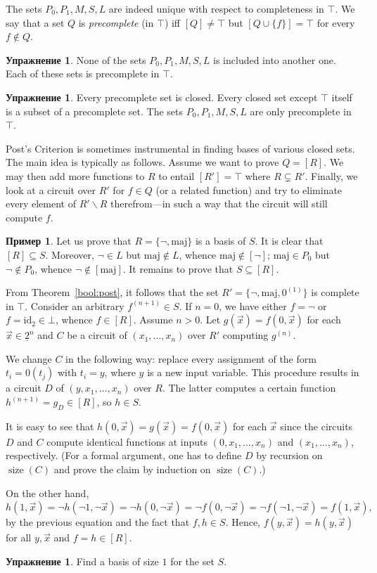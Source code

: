 \documentclass[12pt,notitlepage]{article}
\theoremstyle{plain}
\theoremstyle{definition}
\newtheorem{exc}[thm]{Упражнение}
\newtheorem{exm}[thm]{Пример}
\theoremstyle{plain}
\newcommand{\sbs}{\subseteq}
\renewcommand{\setminus}{\smallsetminus}
\newcommand{\id}{\mathrm{id}}
\newcommand{\ul}[1]{\underline{#1}}
\newcommand{\1}{\mathbf{1}}
\newcommand{\0}{\mathbf{0}}
\DeclareMathOperator{\sz}{\mathrm size}
\begin{document}
The sets $P_0, P_1, M, S, L$ are indeed unique with respect to completeness in $\top$. We say that a set $Q$ is \emph{precomplete} (in $\top$) iff $[Q] \neq \top$ but $[Q \cup \{f\}] = \top$ for every $f \notin Q$.
\begin{exc}
	None of the sets $P_0, P_1, M, S, L$ is included into another one. Each of these sets is precomplete in $\top$.
\end{exc}
\begin{exc}
	Every precomplete set is closed. Every closed set except $\top$ itself is a subset of a precomplete set. The sets $P_0, P_1, M, S, L$ are only precomplete in $\top$.
\end{exc}

Post's Criterion is sometimes instrumental in finding bases of various closed sets. The main idea is typically as follows. Assume we want to prove $Q = [R]$. We may then add more functions to $R$ to entail $[R'] = \top$ where $R \subsetneq R'$. Finally, we look at a circuit over $R'$ for $f \in Q$ (or a related function) and try to eliminate every element of $R' \setminus R$ therefrom---in such a way that the circuit will still compute $f$.

\begin{exm}
	Let us prove that $R = \{\neg, \mathrm{maj}\}$ is a basis of $S$. It is clear that $[R] \sbs S$. Moreover, $\neg \in L$ but $\mathrm{maj} \notin L$, whence $\mathrm{maj} \notin [{\neg}]$; $\mathrm{maj} \in P_0$ but $\neg \notin P_0$, whence ${\neg} \notin [\mathrm{maj}]$. It remains to prove that $S \sbs [R]$.
	
	From Theorem~\ref{bool:post}, it follows that the set $R' = \{{\neg}, \mathrm{maj}, 0^{(1)}\}$ is complete in $\top$. Consider an arbitrary $f^{(n + 1)} \in S$. If $n = 0$, we have either $f = {\neg}$ or $f = \id_{\ul{2}} \in \bot$, whence $f \in [R]$. Assume $n > 0$. Let $g(\vec x) = f(0, \vec x)$ for each $\vec x \in \ul{2}^{n}$ and $C$ be a circuit of $(x_1, \ldots, x_n)$ over $R'$ computing $g^{(n)}$.
	
	We change $C$ in the following way: replace every assignment of the form $t_i = 0(t_j)$ with $t_i = y$, where $y$ is a new input variable. This procedure results in a circuit $D$ of $(y,x_1, \ldots, x_n)$ over $R$. The latter computes a certain function $h^{(n+1)} = g_D \in [R]$, so $h \in S$.
	
	It is easy to see that $h(0, \vec x) = g(\vec x) = f(0, \vec x)$ for each $\vec x$ since the circuits $D$ and $C$ compute identical functions at inputs $(0, x_1, \ldots, x_n)$ and $(x_1, \ldots, x_n)$, respectively. (For a formal argument, one has to define $D$ by recursion on $\sz(C)$ and prove the claim by induction on $\sz(C)$.)
	
	On the other hand, 
	$h(1, \vec x) = \neg h(\neg 1, \neg \vec x) = \neg h (0, \neg \vec x) = \neg f(0, \neg \vec x) = \neg f(\neg 1, \neg \vec x) = f(1, \vec x),$
	by the previous equation and the fact that $f, h \in S$. Hence, $f(y, \vec x) = h(y, \vec x)$ for all $y, \vec x$ and $f = h \in [R]$.
\end{exm}
\begin{exc}
	Find a basis of size $1$ for the set $S$.
\end{exc}
\end{document}
